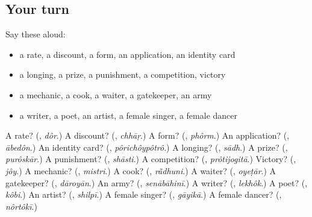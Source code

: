 \subsection*{Your turn}
Say these aloud:

\begin{itemize}
\raggedright
  \item a rate, a discount, a form, an application, an identity card
  \item a longing, a prize, a punishment, a competition, victory
  \item a mechanic, a cook, a waiter, a gatekeeper, an army
  \item a writer, a poet, an artist, a female singer, a female dancer
\end{itemize}

\begin{tcolorbox}[breakable,colback=teal!4,colframe=teal!35!black,title={Before you move on}]
A rate? (\textbf{}, \emph{dôr}.) A discount? (\textbf{}, \emph{chhāṛ}.) A form? (\textbf{}, \emph{phôrm}.) An application? (\textbf{}, \emph{ābedôn}.) An identity card? (\textbf{}, \emph{pôrichôypôtrô}.) A longing? (\textbf{}, \emph{sādh}.) A prize? (\textbf{}, \emph{purôskār}.) A punishment? (\textbf{}, \emph{shāsti}.) A competition? (\textbf{}, \emph{prôtijogitā}.) Victory? (\textbf{}, \emph{jôy}.) A mechanic? (\textbf{}, \emph{mistri}.) A cook? (\textbf{}, \emph{rā̃dhuni}.) A waiter? (\textbf{}, \emph{oyeṭār}.) A gatekeeper? (\textbf{}, \emph{dāroyān}.) An army? (\textbf{}, \emph{senābāhinī}.) A writer? (\textbf{}, \emph{lekhôk}.) A poet? (\textbf{}, \emph{kôbi}.) An artist? (\textbf{}, \emph{shilpī}.) A female singer? (\textbf{}, \emph{gāyikā}.) A female dancer? (\textbf{}, \emph{nôrtôkī}.)
\end{tcolorbox}
